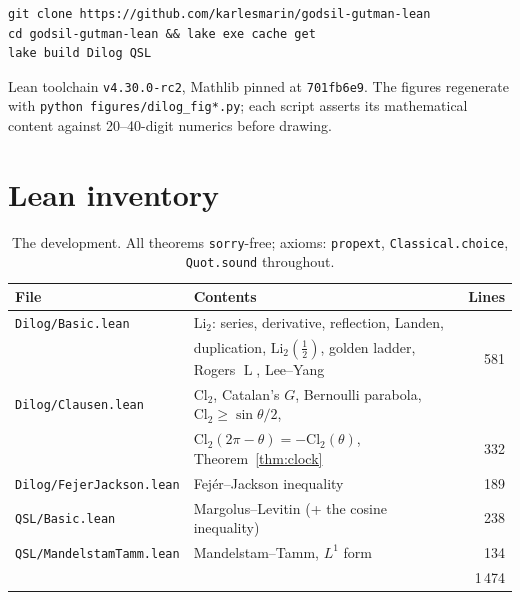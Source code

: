 \documentclass[11pt]{article}
\newcommand{\lean}[1]{\texttt{#1}}
\newcommand{\Li}{\mathrm{Li}_2}
\newcommand{\Cl}{\mathrm{Cl}_2}
\DeclareMathOperator{\Lrog}{L}
\begin{document}
\begin{verbatim}
git clone https://github.com/karlesmarin/godsil-gutman-lean
cd godsil-gutman-lean && lake exe cache get
lake build Dilog QSL
\end{verbatim}
Lean toolchain \lean{v4.30.0-rc2}, Mathlib pinned at \lean{701fb6e9}. The figures
regenerate with \lean{python figures/dilog\_fig*.py}; each script asserts its
mathematical content against 20--40-digit numerics before drawing.

\section{Lean inventory}

\begin{table}[H]
\centering\small
\begin{tabular}{@{}llr@{}}
\toprule
\rowcolor{ggteal!18} File & Contents & Lines\\
\midrule
\rowcolor{ggband!35} \lean{Dilog/Basic.lean} & $\Li$: series, derivative, reflection, Landen,&\\
\rowcolor{ggband!35} & duplication, $\Li(\frac12)$, golden ladder, Rogers $\Lrog$, Lee--Yang & 581\\
\lean{Dilog/Clausen.lean} & $\Cl$, Catalan's $G$, Bernoulli parabola, $\Cl\ge\sin\theta/2$,&\\
& $\Cl(2\pi-\theta)=-\Cl(\theta)$, Theorem~\ref{thm:clock} & 332\\
\rowcolor{ggband!35} \lean{Dilog/FejerJackson.lean} & Fej\'er--Jackson inequality & 189\\
\lean{QSL/Basic.lean} & Margolus--Levitin (+ the cosine inequality) & 238\\
\rowcolor{ggband!35} \lean{QSL/MandelstamTamm.lean} & Mandelstam--Tamm, $L^1$ form & 134\\
\midrule
&& 1\,474\\
\bottomrule
\end{tabular}
\caption{The development. All theorems \lean{sorry}-free; axioms:
\lean{propext}, \lean{Classical.choice}, \lean{Quot.sound} throughout.}
\label{tab:inventory}
\end{table}
\end{document}
